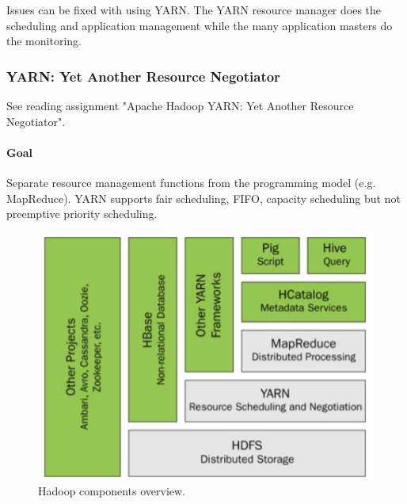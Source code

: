 Issues can be fixed with using YARN. The YARN resource manager does the scheduling and application management while the many application masters do the monitoring.


\subsubsection{YARN: Yet Another Resource Negotiator}

See reading assignment "Apache Hadoop YARN: Yet Another Resource Negotiator".

\paragraph{Goal}
Separate resource management functions from the programming model (e.g. MapReduce). YARN supports fair scheduling, FIFO, capacity scheduling but not preemptive priority scheduling. %

\begin{figure}[h]
	\centering
	\includegraphics[scale=0.6]{images/4-yarn_hadoop.PNG}
	\caption{Hadoop components overview.}
	\label{fig:yarn_hadoop}
\end{figure}

